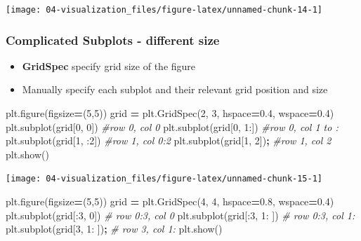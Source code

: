 \documentclass[
]{book}
\newenvironment{Shaded}{\begin{snugshade}}{\end{snugshade}}
\newcommand{\CommentTok}[1]{\textcolor[rgb]{0.37,0.37,0.37}{\textit{#1}}}
\newcommand{\DecValTok}[1]{\textcolor[rgb]{0.06,0.06,0.06}{#1}}
\newcommand{\FloatTok}[1]{\textcolor[rgb]{0.06,0.06,0.06}{#1}}
\newcommand{\NormalTok}[1]{#1}
\newcommand{\OperatorTok}[1]{\textcolor[rgb]{0.43,0.43,0.43}{\textbf{#1}}}
\providecommand{\tightlist}{%
  \setlength{\itemsep}{0pt}\setlength{\parskip}{0pt}}
\begin{document}
\texttt{[image: 04-visualization\_files/figure-latex/unnamed-chunk-14-1]}

\hypertarget{complicated-subplots---different-size}{%
\subsubsection{Complicated Subplots - different size}\label{complicated-subplots---different-size}}

\begin{itemize}
\tightlist
\item
  \textbf{GridSpec} specify grid size of the figure\\
\item
  Manually specify each subplot and their relevant grid position and size
\end{itemize}

\begin{Shaded}
\begin{Highlighting}[]
\NormalTok{plt.figure(figsize}\OperatorTok{=}\NormalTok{(}\DecValTok{5}\NormalTok{,}\DecValTok{5}\NormalTok{))}
\NormalTok{grid }\OperatorTok{=}\NormalTok{ plt.GridSpec(}\DecValTok{2}\NormalTok{, }\DecValTok{3}\NormalTok{, hspace}\OperatorTok{=}\FloatTok{0.4}\NormalTok{, wspace}\OperatorTok{=}\FloatTok{0.4}\NormalTok{)}
\NormalTok{plt.subplot(grid[}\DecValTok{0}\NormalTok{, }\DecValTok{0}\NormalTok{])  }\CommentTok{#row 0, col 0}
\NormalTok{plt.subplot(grid[}\DecValTok{0}\NormalTok{, }\DecValTok{1}\NormalTok{:]) }\CommentTok{#row 0, col 1 to :}
\NormalTok{plt.subplot(grid[}\DecValTok{1}\NormalTok{, :}\DecValTok{2}\NormalTok{]) }\CommentTok{#row 1, col 0:2 }
\NormalTok{plt.subplot(grid[}\DecValTok{1}\NormalTok{, }\DecValTok{2}\NormalTok{])}\OperatorTok{;} \CommentTok{#row 1, col 2}
\NormalTok{plt.show()}
\end{Highlighting}
\end{Shaded}

\texttt{[image: 04-visualization\_files/figure-latex/unnamed-chunk-15-1]}

\begin{Shaded}
\begin{Highlighting}[]
\NormalTok{plt.figure(figsize}\OperatorTok{=}\NormalTok{(}\DecValTok{5}\NormalTok{,}\DecValTok{5}\NormalTok{))}
\NormalTok{grid }\OperatorTok{=}\NormalTok{ plt.GridSpec(}\DecValTok{4}\NormalTok{, }\DecValTok{4}\NormalTok{, hspace}\OperatorTok{=}\FloatTok{0.8}\NormalTok{, wspace}\OperatorTok{=}\FloatTok{0.4}\NormalTok{)}
\NormalTok{plt.subplot(grid[:}\DecValTok{3}\NormalTok{, }\DecValTok{0}\NormalTok{])    }\CommentTok{# row 0:3, col 0}
\NormalTok{plt.subplot(grid[:}\DecValTok{3}\NormalTok{, }\DecValTok{1}\NormalTok{: ])  }\CommentTok{# row 0:3, col 1:}
\NormalTok{plt.subplot(grid[}\DecValTok{3}\NormalTok{, }\DecValTok{1}\NormalTok{: ])}\OperatorTok{;}  \CommentTok{# row 3,   col 1:}
\NormalTok{plt.show()}
\end{Highlighting}
\end{Shaded}
\end{document}
